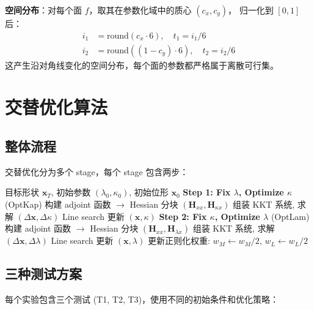 \documentclass[12pt,a4paper]{article}
\begin{document}
\textbf{空间分布}：对每个面 $f$，取其在参数化域中的质心 $(c_x, c_y)$，
归一化到 $[0,1]$ 后：
\begin{align}
    i_1 &= \text{round}(c_x \cdot 6), \quad t_1 = i_1 / 6 \\
    i_2 &= \text{round}((1 - c_y) \cdot 6), \quad t_2 = i_2 / 6
\end{align}
这产生沿对角线变化的空间分布，每个面的参数都严格属于离散可行集。

\section{交替优化算法}

\subsection{整体流程}

交替优化分为多个 stage，每个 stage 包含两步：

\begin{algorithm}[H]
\caption{交替 SGN 逆向设计}
\begin{algorithmic}[1]
\REQUIRE 目标形状 $\mathbf{x}_T$, 初始参数 $(\lambda_0, \kappa_0)$, 初始位形 $\mathbf{x}_0$
    \STATE \textbf{Step 1: Fix $\lambda$, Optimize $\kappa$} (OptKap)
    \STATE \quad 构建 adjoint 函数 $\rightarrow$ Hessian 分块 $(\mathbf{H}_{xx}, \mathbf{H}_{\kappa x})$
    \STATE \quad 组装 KKT 系统, 求解 $(\Delta \mathbf{x}, \Delta \kappa)$
    \STATE \quad Line search 更新 $(\mathbf{x}, \kappa)$
    \STATE
    \STATE \textbf{Step 2: Fix $\kappa$, Optimize $\lambda$} (OptLam)
    \STATE \quad 构建 adjoint 函数 $\rightarrow$ Hessian 分块 $(\mathbf{H}_{xx}, \mathbf{H}_{\lambda x})$
    \STATE \quad 组装 KKT 系统, 求解 $(\Delta \mathbf{x}, \Delta \lambda)$
    \STATE \quad Line search 更新 $(\mathbf{x}, \lambda)$
    \STATE
    \STATE 更新正则化权重: $w_M \leftarrow w_M / 2$, $w_L \leftarrow w_L / 2$
\ENDFOR
\end{algorithmic}
\end{algorithm}

\subsection{三种测试方案}

每个实验包含三个测试 (T1, T2, T3)，使用不同的初始条件和优化策略：
\end{document}
